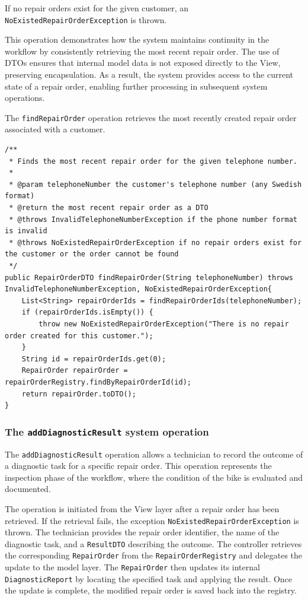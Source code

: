 \documentclass[a4paper]{scrartcl}
\begin{document}
If no repair orders exist for the given customer, an \texttt{NoExistedRepairOrderException} is thrown.

This operation demonstrates how the system maintains continuity in the workflow by consistently retrieving the most recent repair order. The use of DTOs ensures that internal model data is not exposed directly to the View, preserving encapsulation. As a result, the system provides access to the current state of a repair order, enabling further processing in subsequent system operations.

The \texttt{findRepairOrder} operation retrieves the most recently created repair order associated with a customer.

\begin{lstlisting}[style=javastyle, caption={Method for finding a repair order by a given telephone number \texttt{findRepairOrder} in \texttt{Controller} (shared by both technician and receptionist)}]
/**
 * Finds the most recent repair order for the given telephone number.
 *
 * @param telephoneNumber the customer's telephone number (any Swedish format)
 * @return the most recent repair order as a DTO
 * @throws InvalidTelephoneNumberException if the phone number format is invalid
 * @throws NoExistedRepairOrderException if no repair orders exist for the customer or the order cannot be found
 */
public RepairOrderDTO findRepairOrder(String telephoneNumber) throws InvalidTelephoneNumberException, NoExistedRepairOrderException{
    List<String> repairOrderIds = findRepairOrderIds(telephoneNumber);
    if (repairOrderIds.isEmpty()) {
        throw new NoExistedRepairOrderException("There is no repair order created for this customer.");
    }
    String id = repairOrderIds.get(0);
    RepairOrder repairOrder = repairOrderRegistry.findByRepairOrderId(id);
    return repairOrder.toDTO();
}
\end{lstlisting}

\subsubsection{The \texttt{addDiagnosticResult} system operation}

The \texttt{addDiagnosticResult} operation allows a technician to record the outcome of a diagnostic task for a specific repair order. This operation represents the inspection phase of the workflow, where the condition of the bike is evaluated and documented.

The operation is initiated from the View layer after a repair order has been retrieved. If the retrieval fails, the exception \texttt{NoExistedRepairOrderException} is thrown. The technician provides the repair order identifier, the name of the diagnostic task, and a \texttt{ResultDTO} describing the outcome. The controller retrieves the corresponding \texttt{RepairOrder} from the \texttt{RepairOrderRegistry} and delegates the update to the model layer. The \texttt{RepairOrder} then updates its internal \texttt{DiagnosticReport} by locating the specified task and applying the result. Once the update is complete, the modified repair order is saved back into the registry.
\end{document}
